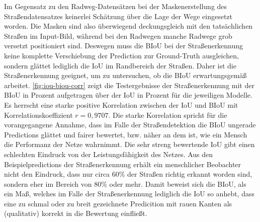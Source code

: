 Im Gegensatz zu den Radweg-Datensätzen bei der Maskenerstellung des Straßendatensatzes keinerlei Schätzung 
über die Lage der Wege eingesetzt worden. Die Masken sind also überwiegend deckungsgleich mit den tatsächlichen 
Straßen im Input-Bild, während bei den Radwegen manche Radwege grob versetzt positioniert sind. 
Deswegen muss die BIoU bei der Straßenerkennung keine komplette Verschiebung der Prediction zur Ground-Truth ausgleichen, 
sondern glättet lediglich die IoU im Randbereich der Straßen. Daher ist die Straßenerkennung geeignet, 
um zu untersuchen, ob die BIoU erwartungsgemäß arbeitet. \autoref{fig:iou-biou-corr} zeigt die Testergebnisse der 
Straßenerkennung mit der BIoU in Prozent aufgetragen über der IoU in Prozent für die jeweiligen Modelle. 
Es herrscht eine starke positive Korrelation zwischen der IoU und BIoU mit Korrelationskoeffizient $r = 0,9707$. 
Die starke Korrelation spricht für die vorangegangene Annahme, dass im Falle der Straßendetektion die BIoU 
ungerade Predictions glättet und fairer bewertet, bzw. näher an dem ist, wie ein Mensch die Performanz der 
Netze wahrnimmt. Die sehr streng bewertende IoU gibt einen schlechten Eindruck von der Leistungsfähigkeit des Netzes. 
Aus den Beispielpredictions der Straßenerkennung erhält ein menschlicher Beobachter nicht den Eindruck, 
dass nur circa 60\% der Straßen richtig erkannt worden sind, sondern eher im Bereich von 80\% oder mehr. 
Damit beweist sich die BIoU, als ein Maß, welches im Falle der Straßenerkennung lediglich die IoU so anhebt, 
dass eine zu schmal oder zu breit gezeichnete Predicition mit rauen Kanten als (qualitativ) korrekt in 
die Bewertung einfließt.  
